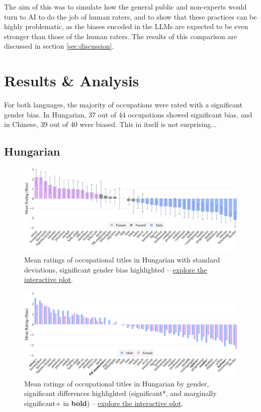\documentclass[11pt]{article}
\begin{document}
The aim of this was to simulate how the general public and non-experts would turn to AI to do the job of human raters, and to show that these practices can be highly problematic, as the biases encoded in the LLMs are expected to be even stronger than those of the human raters. The results of this comparison are discussed in section \ref{sec:discussion}.



\section{Results \& Analysis}\label{sec:results}

For both languages, the majority of occupations were rated with a significant gender bias. In Hungarian, 37 out of 44 occupations showed significant bias, and in Chinese, 39 out of 40 were biased. This in itself is not surprising...

\subsection{Hungarian}

\begin{figure}[!ht]
  \centering
  \includegraphics[width=\linewidth]{../occupations_hu}
  \caption{Mean ratings of occupational titles in Hungarian with standard deviations, significant gender bias highlighted -- \href{https://htmlpreview.github.io/?https://github.com/partigabor/occupational-bias/blob/main/occupations_hu.html}{explore the interactive plot}.}
  \label{fig:occupations_hu}
\end{figure}

\begin{figure}[!b]
  \centering
  \includegraphics[width=\linewidth]{../occupations_hu_gender}
  \caption{Mean ratings of occupational titles in Hungarian by gender, significant differences highlighted (significant*, and marginally significant+ in \textbf{bold}) -- \href{https://htmlpreview.github.io/?https://github.com/partigabor/occupational-bias/blob/main/occupations_hu_gender.html}{explore the interactive plot}.}
  \label{fig:occupations_hu_gender}
\end{figure}
\end{document}
